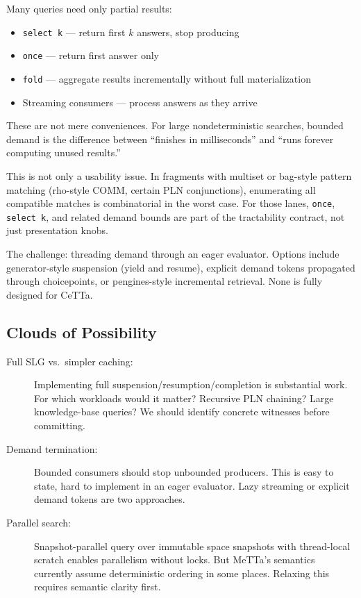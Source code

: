 \documentclass[11pt]{article}
\newcommand{\code}[1]{\texttt{#1}}
\newcommand{\CeTTa}{\textup{CeTTa}}
\begin{document}
Many queries need only partial results:
\begin{itemize}
\item \code{select k} --- return first $k$ answers, stop producing
\item \code{once} --- return first answer only
\item \code{fold} --- aggregate results incrementally without full materialization
\item Streaming consumers --- process answers as they arrive
\end{itemize}

These are not mere conveniences.  For large nondeterministic searches,
bounded demand is the difference between ``finishes in milliseconds'' and
``runs forever computing unused results.''

This is not only a usability issue.  In fragments with multiset or
bag-style pattern matching (rho-style COMM, certain PLN conjunctions),
enumerating all compatible matches is combinatorial in the worst case.
For those lanes, \code{once}, \code{select k}, and related demand bounds
are part of the tractability contract, not just presentation knobs.

The challenge: threading demand through an eager evaluator.  Options include
generator-style suspension (yield and resume), explicit demand tokens
propagated through choicepoints, or pengines-style incremental retrieval.
None is fully designed for \CeTTa{}.

\subsection{Clouds of Possibility}

\begin{description}
\item[Full SLG vs.\ simpler caching:]
  Implementing full suspension/resumption/completion is substantial work.
  For which workloads would it matter?  Recursive PLN chaining?  Large
  knowledge-base queries?  We should identify concrete witnesses before
  committing.
\item[Demand termination:]
  Bounded consumers should stop unbounded producers.  This is easy to
  state, hard to implement in an eager evaluator.  Lazy streaming or
  explicit demand tokens are two approaches.
\item[Parallel search:]
  Snapshot-parallel query over immutable space snapshots with thread-local
  scratch enables parallelism without locks.  But MeTTa's semantics
  currently assume deterministic ordering in some places.  Relaxing this
  requires semantic clarity first.
\end{description}
\end{document}
